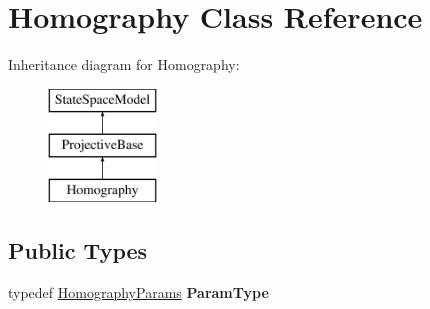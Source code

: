 \hypertarget{classHomography}{\section{Homography Class Reference}
\label{classHomography}
}
Inheritance diagram for Homography\-:\begin{figure}[H]
\begin{center}
\leavevmode
\includegraphics[height=3.000000cm]{classHomography}
\end{center}
\end{figure}
\subsection*{Public Types}
\begin{DoxyCompactItemize}
\item 
\hypertarget{classHomography_a263893666fd512975f8d6c01b1bbf8b0}{typedef \hyperlink{structHomographyParams}{Homography\-Params} {\bfseries Param\-Type}}\label{classHomography_a263893666fd512975f8d6c01b1bbf8b0}

\end{DoxyCompactItemize}
